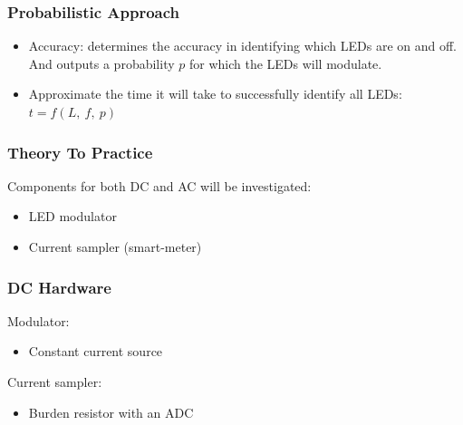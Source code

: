 \documentclass{beamer}
\begin{document}
	\begin{frame}\frametitle{Probabilistic Approach}

		\begin{itemize}

			\item Accuracy: determines the accuracy in identifying which LEDs are on and off. And outputs a probability $p$ for which the LEDs will modulate.

			\item Approximate the time it will take to successfully identify all LEDs: $t = f(L,\ f,\ p)$

		\end{itemize}
		
	\end{frame}





	\begin{frame}\frametitle{Theory To Practice}

		Components for both DC and AC will be investigated: 

		\begin{itemize}

			\item LED modulator

			\item Current sampler (smart-meter)

		\end{itemize}
		
	\end{frame}


	\begin{frame}\frametitle{DC Hardware}

		Modulator: 

		\begin{itemize}

			\item Constant current source

		\end{itemize}

		Current sampler: 

		\begin{itemize}

			\item Burden resistor with an ADC

		\end{itemize}
		
	\end{frame}
\end{document}
